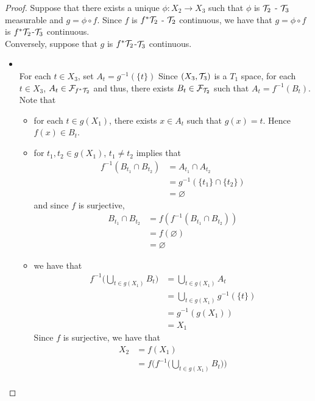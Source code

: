 \documentclass{book}
\begin{document}
	\begin{proof}
	
	Suppose that there exists a unique $\phi: X_2 \rightarrow X_3$ such that $\phi$ is $\mathcal{T}_2$ - $\mathcal{T}_3$ measurable and $g = \phi \circ f$. Since $f$ is $f^* \mathcal{T}_2$ - $\mathcal{T}_2$ continuous, we have that $g = \phi \circ f$ is $f^*\mathcal{T}_2$-$\mathcal{T}_3$ continuous.  \\
	Conversely, suppose that $g$ is $f^*\mathcal{T}_2$-$\mathcal{T}_3$ continuous. \\
	\begin{itemize}
	\item {} \\
	For each $t \in X_3$, set $A_t = g^{-1}(\{t\})$ Since $(X_3, \mathcal{T}_3)$ is a $T_1$ space, for each $t \in X_3$, $A_t \in \mathcal{F}_{f^*\mathcal{T}_2}$ and thus, there exists $B_t \in \mathcal{F}_{\mathcal{T}_2}$ such that $A_t = f^{-1}(B_t)$. \\
	Note that 
	\begin{itemize}
	\item for each $t \in g(X_1)$, there exists $x \in A_t$ such that $g(x) = t$. Hence $f(x) \in B_t$.\\
	\item for $t_1, t_2 \in g(X_1)$, $t_1 \neq t_2$ implies that
	\begin{align*}
	f^{-1}(B_{t_1} \cap B_{t_2}) 
	&= A_{t_1} \cap A_{t_2} \\
	&= g^{-1}(\{t_1\} \cap \{t_2\}) \\
	&= \varnothing
	\end{align*}	 
	and since $f$ is surjective, 
	\begin{align*}
	B_{t_1} \cap  B_{t_2} 
	& = f(f^{-1}(B_{t_1} \cap  B_{t_2} )) \\
	&= f(\varnothing) \\
	&= \varnothing
	\end{align*}
	\item we have that 
	\begin{align*}
	f^{-1} \bigg( \bigcup_{t \in g(X_1)} B_t\bigg) 
	&=  \bigcup_{t \in g(X_1)} A_t \\
	&= \bigcup_{t \in g(X_1)} g^{-1}(\{t\}) \\
	&= g^{-1}(g(X_1)) \\
	&= X_1
	\end{align*}
	Since $f$ is surjective, we have that 
	\begin{align*}
	X_2
	&= f(X_1) \\
	&= f \bigg( f^{-1} \bigg( \bigcup_{t \in g(X_1)} B_t\bigg)  \bigg) \\

\end{align*}
\end{itemize}
\end{itemize}
\end{proof}
\end{document}
